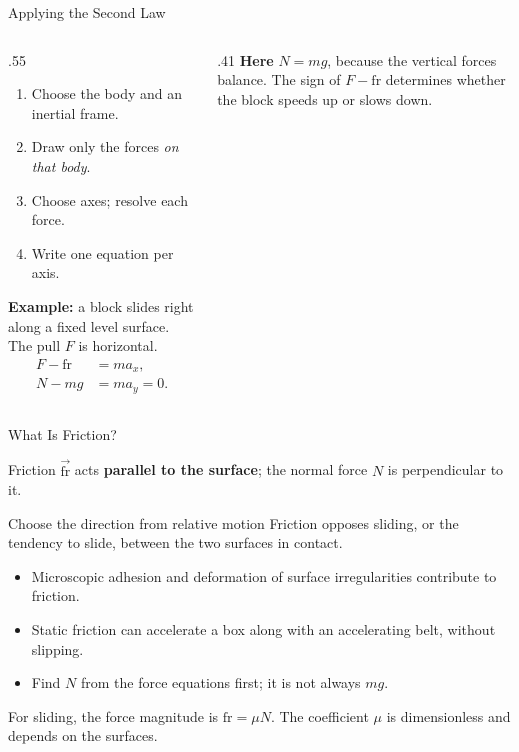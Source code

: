 \begin{frame}{Applying the Second Law}
  \par
  \small
  \begin{columns}[T,onlytextwidth]
    \begin{column}{.55\textwidth}
      \begin{enumerate}
        \item Choose the body and an inertial frame.
        \item Draw only the forces \emph{on that body}.
        \item Choose axes; resolve each force.
        \item Write one equation per axis.
      \end{enumerate}
      \medskip
      \textbf{Example:} a block slides right along a fixed level surface.
      The pull \(F\) is horizontal.
      \[
        \begin{aligned}
          F-\mathrm{fr}&=ma_x,\\
          N-mg&=ma_y=0.
        \end{aligned}
      \]
    \end{column}
    \begin{column}{.41\textwidth}
      \smallskip
      \textbf{Here} \(N=mg\), because the vertical forces balance.
      The sign of \(F-\mathrm{fr}\) determines whether the block speeds up
      or slows down.
    \end{column}
  \end{columns}
\end{frame}

\begin{frame}{What Is Friction?}
  \par
  Friction \(\vec{\mathrm{fr}}\) acts \textbf{parallel to the surface};
  the normal force \(N\) is perpendicular to it.
  \begin{block}{Choose the direction from relative motion}
    Friction opposes sliding, or the tendency to slide,
    between the two surfaces in contact.
  \end{block}
  \begin{itemize}
    \item Microscopic adhesion and deformation of surface irregularities
      contribute to friction.
    \item Static friction can accelerate a box along with an accelerating
      belt, without slipping.
    \item Find \(N\) from the force equations first; it is not always \(mg\).
  \end{itemize}
  \medskip
  For sliding, the force magnitude is \(\mathrm{fr}=\mu N\).
  The coefficient \(\mu\) is dimensionless and depends on the surfaces.
\end{frame}

